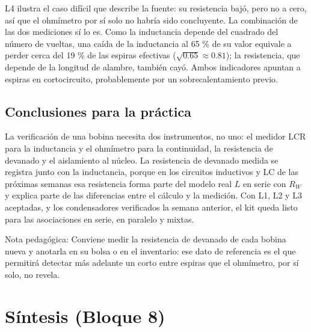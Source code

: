 \documentclass[11pt,letterpaper]{article}
\begin{document}
L4 ilustra el caso difícil que describe la fuente: su resistencia bajó, pero no a cero, así que el ohmímetro por sí solo no habría sido concluyente. La combinación de las dos mediciones sí lo es. Como la inductancia depende del cuadrado del número de vueltas, una caída de la inductancia al 65 \% de su valor equivale a perder cerca del 19 \% de las espiras efectivas ($\sqrt{0.65} \approx 0.81$); la resistencia, que depende de la longitud de alambre, también cayó. Ambos indicadores apuntan a espiras en cortocircuito, probablemente por un sobrecalentamiento previo.

\subsection{Conclusiones para la práctica}

La verificación de una bobina necesita dos instrumentos, no uno: el medidor LCR para la inductancia y el ohmímetro para la continuidad, la resistencia de devanado y el aislamiento al núcleo. La resistencia de devanado medida se registra junto con la inductancia, porque en los circuitos inductivos y LC de las próximas semanas esa resistencia forma parte del modelo real $L$ en serie con $R_W$ y explica parte de las diferencias entre el cálculo y la medición. Con L1, L2 y L3 aceptadas, y los condensadores verificados la semana anterior, el kit queda listo para las asociaciones en serie, en paralelo y mixtas.

\begin{nota}{Nota pedagógica:}
Conviene medir la resistencia de devanado de cada bobina nueva y anotarla en su bolsa o en el inventario: ese dato de referencia es el que permitirá detectar más adelante un corto entre espiras que el ohmímetro, por sí solo, no revela.
\end{nota}

\section{Síntesis (Bloque 8)}
\end{document}
